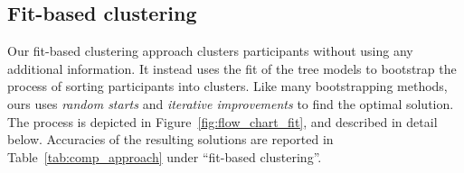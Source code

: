 %
%
%




\subsection{Fit-based clustering}
Our fit-based clustering approach clusters participants without using any additional information. It instead uses the fit of the tree models to bootstrap the process of sorting participants into clusters. Like many bootstrapping methods, ours uses \emph{random starts} and \emph{iterative improvements} to find the optimal solution. The process is depicted in Figure~\ref{fig:flow_chart_fit}, and described in detail below. Accuracies of the resulting solutions are reported in Table~\ref{tab:comp_approach} under ``fit-based clustering''.


